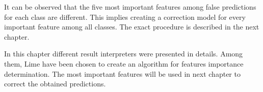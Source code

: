 
It can be observed that the five most important features among false predictions for each class are different. This implies creating a correction model for every important feature among all classes.  The exact procedure is described in the next chapter.

In this chapter different result interpreters were presented in details. Among them, Lime have been chosen to create an algorithm for features importance determination. The most important features will be used in next chapter to correct the obtained predictions. 